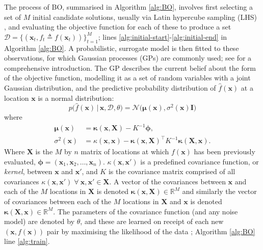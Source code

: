 \documentclass[runningheads]{llncs}
\newcommand{\given}{\,|\,}
\newcommand{\bx}{\mathbf{x}}
\newcommand{\bX}{\mathbf{X}}
\newcommand{\bI}{\mathbf{I}}
\newcommand{\bmu}{\boldsymbol{\mu}}
\newcommand{\bphi}{\boldsymbol{\phi}}
\begin{document}
The process of BO, summarised in Algorithm \ref{alg:BO}, involves first selecting a set of $M$ initial candidate solutions, usually via Latin hypercube sampling (LHS) \cite{mckay2000comparison}, and evaluating the objective function for each of these to produce a set $\mathcal{D} = \{ (\bx_t, f_t \triangleq f(\bx_t) )\}_{t=1}^M$; lines \ref{alg:initial-start}-\ref{alg:initial-end} in Algorithm \ref{alg:BO}. A probabilistic, surrogate model is then fitted to these observations, for which  Gaussian processes (GPs) are commonly used; see \cite{rasmussen2003gaussian} for a comprehensive introduction.
The GP describes the current belief about the form of the objective function, modelling it as a set of random variables with a joint Gaussian distribution, and the predictive probability distribution of $\hat{f}(\bx)$ at a location $\bx$ is a normal distribution:
\begin{equation}\label{eqn: P(f_t+1)}
p\big(\hat{f}(\mathbf{x}) \given \mathbf{x}, \mathcal{D}, \theta \big) = 
\mathcal{N}\big(\bmu(\mathbf{x}), \sigma^2(\mathbf{x})\bI\big)
\end{equation}
where
\begin{align}\label{eqn: mu}
\bmu(\mathbf{x}) &= \boldsymbol{\kappa}(\mathbf{x}, \mathbf{X}) - K^{-1}  \bphi,\\
\label{eqn: sigma}
\sigma^2(\mathbf{x}) &= \kappa(\mathbf{x}, \mathbf{x}) - \boldsymbol{\kappa}(\mathbf{x}, \mathbf{X})^{\top}K^{-1} \boldsymbol{\kappa}(\mathbf{X}, \mathbf{x}).
\end{align}
Where $\bX$ is the $M$ by $n$ matrix of locations at which $f(\bx)$ has
been previously evaluated, $\bphi = (\bx_1, \bx_2, \ldots, \bx_n)$.
$\kappa(\mathbf{x}, \mathbf{x}')$ is a predefined
covariance function, or  \textit{kernel}, between $\mathbf{x}$ and
$\mathbf{x}'$, and  $K$ is the covariance matrix comprised of all
covariances $\kappa(\mathbf{x}, \mathbf{x}') \; \forall \: \mathbf{x},
\mathbf{x}'\in \mathbf{X}$. A vector of the covariances between
$\mathbf{x}$ and each of the $M$ locations in $\mathbf{X}$ is denoted
$\boldsymbol{\kappa}(\mathbf{x}, \mathbf{X})\in \mathbb{R}^{M}$ and
similarly the vector of covariances between each of the $M$ locations in
$\mathbf{X}$ and $\mathbf{x}$ is denoted $\boldsymbol{\kappa}(\mathbf{X},
\mathbf{x}) \in \mathbb{R}^{M}$. The parameters of the covariance function
(and any noise model) are denoted by $\theta$, and these are learned on receipt of each new $(\bx, f(\bx))$ pair by maximising the likelihood of the data \cite{rasmussen2003gaussian}; Algorithm \ref{alg:BO} line \ref{alg:train}. 
\end{document}
